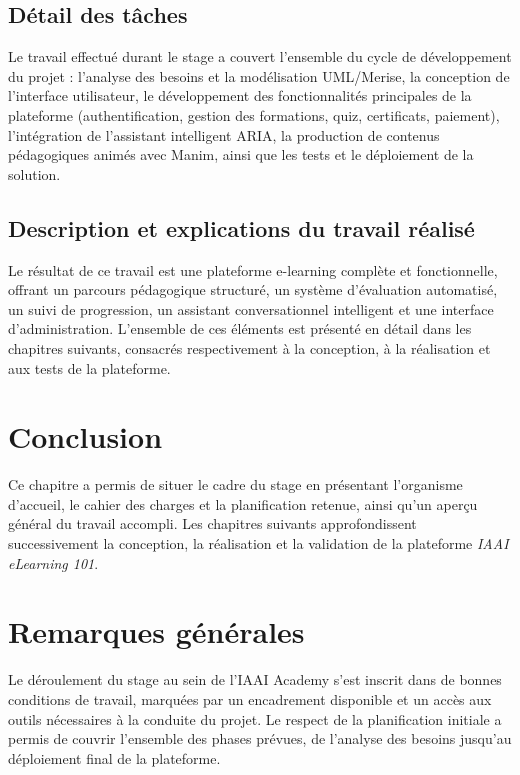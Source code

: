 \documentclass[12pt, a4paper]{report}
\begin{document}
\subsection{Détail des tâches}
Le travail effectué durant le stage a couvert l'ensemble du cycle de
développement du projet : l'analyse des besoins et la modélisation UML/Merise,
la conception de l'interface utilisateur, le développement des fonctionnalités
principales de la plateforme (authentification, gestion des formations, quiz,
certificats, paiement), l'intégration de l'assistant intelligent ARIA, la
production de contenus pédagogiques animés avec Manim, ainsi que les tests et
le déploiement de la solution.

\subsection{Description et explications du travail réalisé}
Le résultat de ce travail est une plateforme e-learning complète et fonctionnelle,
offrant un parcours pédagogique structuré, un système d'évaluation automatisé,
un suivi de progression, un assistant conversationnel intelligent et une
interface d'administration. L'ensemble de ces éléments est présenté en détail
dans les chapitres suivants, consacrés respectivement à la conception, à la
réalisation et aux tests de la plateforme.

\section{Conclusion}
Ce chapitre a permis de situer le cadre du stage en présentant l'organisme
d'accueil, le cahier des charges et la planification retenue, ainsi qu'un
aperçu général du travail accompli. Les chapitres suivants approfondissent
successivement la conception, la réalisation et la validation de la
plateforme \textit{IAAI eLearning 101}.

\section{Remarques générales}
Le déroulement du stage au sein de l'IAAI Academy s'est inscrit dans de bonnes
conditions de travail, marquées par un encadrement disponible et un accès aux
outils nécessaires à la conduite du projet. Le respect de la planification
initiale a permis de couvrir l'ensemble des phases prévues, de l'analyse des
besoins jusqu'au déploiement final de la plateforme.

\newpage
\end{document}
